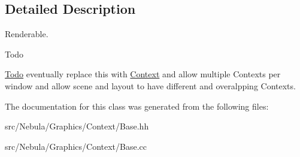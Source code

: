 \subsection{\-Detailed \-Description}
\-Renderable. 

\begin{DoxyRefDesc}{\-Todo}
\item[\hyperlink{todo__todo000010}{\-Todo}]eventually replace this with \hyperlink{namespaceNeb_1_1Graphics_1_1Context}{\-Context} and allow multiple \-Contexts per window and allow scene and layout to have different and overalpping \-Contexts. \end{DoxyRefDesc}


\-The documentation for this class was generated from the following files\-:\begin{DoxyCompactItemize}
\item 
src/\-Nebula/\-Graphics/\-Context/\-Base.\-hh\item 
src/\-Nebula/\-Graphics/\-Context/\-Base.\-cc\end{DoxyCompactItemize}
